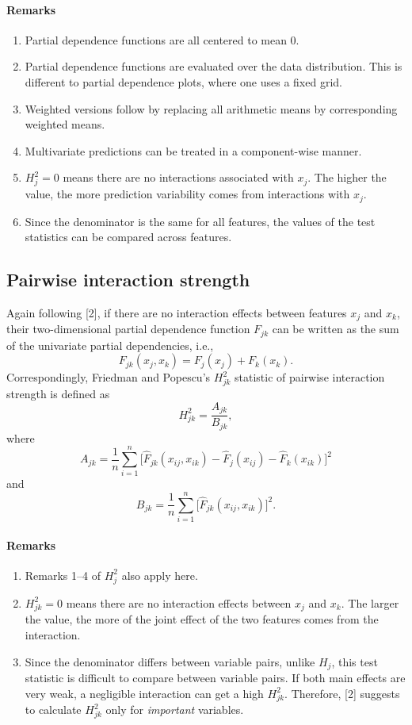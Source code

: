 \documentclass[]{article}
\begin{document}
\paragraph{Remarks}
\begin{enumerate}
	\item Partial dependence functions are all centered to mean 0.
	\item Partial dependence functions are evaluated over the data distribution. This is different to partial dependence plots, where one uses a fixed grid.
	\item Weighted versions follow by replacing all arithmetic means by corresponding weighted means.
	\item Multivariate predictions can be treated in a component-wise manner.
	\item $H^2_j = 0$ means there are no interactions associated with $x_j$. The higher the value, the more prediction variability comes from interactions with $x_j$.
	\item Since the denominator is the same for all features, the values of the test statistics can be compared across features.
\end{enumerate}

\subsection{Pairwise interaction strength}
Again following [2], if there are no interaction effects between features $x_j$ and $x_k$, their two-dimensional partial dependence function $F_{jk}$ can be written as the sum of the univariate partial dependencies, i.e.,
$$
  F_{jk}(x_j, x_k) = F_j(x_j)+ F_k(x_k).
$$
Correspondingly, Friedman and Popescu's $H_{jk}^2$ statistic of pairwise interaction strength is defined as
$$
  H_{jk}^2 = \frac{A_{jk}}{B_{jk}},
$$
where 
$$
  A_{jk} = \frac{1}{n} \sum_{i = 1}^n\big[\hat F_{jk}(x_{ij}, x_{ik}) - \hat F_j(x_{ij}) - \hat F_k(x_{ik})\big]^2
$$
and
$$
  B_{jk} = \frac{1}{n} \sum_{i = 1}^n\big[\hat F_{jk}(x_{ij}, x_{ik})\big]^2.
$$
\paragraph{Remarks}
\begin{enumerate}
	\item Remarks 1--4 of $H^2_{j}$ also apply here.
	\item $H^2_{jk} = 0$ means there are no interaction effects between $x_j$ and $x_k$. The larger the value, the more of the joint effect of the two features comes from the interaction.
	\item Since the denominator differs between variable pairs, unlike $H_j$, this test statistic is difficult to compare between variable pairs. If both main effects are very weak, a negligible interaction can get a high $H^2_{jk}$. Therefore, [2] suggests to calculate $H^2_{jk}$ only for {\em important} variables.
\end{enumerate}
\end{document}
